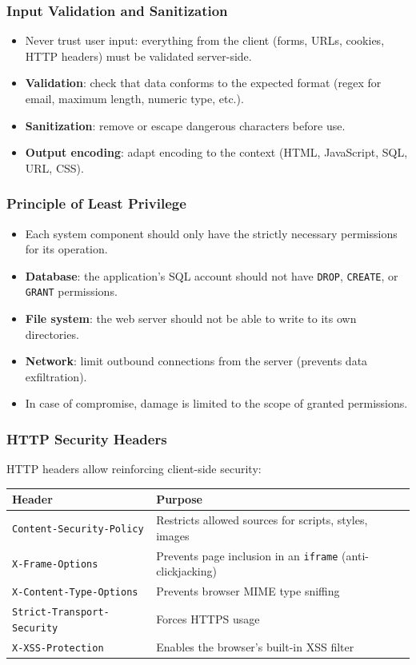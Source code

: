 \documentclass{beamer}
\begin{document}
\begin{frame}
\frametitle{Input Validation and Sanitization}

\begin{itemize}
\item \alert{Never trust user input}: everything from the client (forms, URLs, cookies, HTTP headers) must be validated server-side.
\item \textbf{Validation}: check that data conforms to the expected format (regex for email, maximum length, numeric type, etc.).
\item \textbf{Sanitization}: remove or escape dangerous characters before use.
\item \textbf{Output encoding}: adapt encoding to the context (HTML, JavaScript, SQL, URL, CSS).
\end{itemize}
\end{frame}


\begin{frame}
\frametitle{Principle of Least Privilege}

\begin{itemize}
\item Each system component should only have the \alert{strictly necessary permissions} for its operation.
\item \textbf{Database}: the application's SQL account should not have \texttt{DROP}, \texttt{CREATE}, or \texttt{GRANT} permissions.
\item \textbf{File system}: the web server should not be able to write to its own directories.
\item \textbf{Network}: limit outbound connections from the server (prevents data exfiltration).
\item In case of compromise, damage is \alert{limited} to the scope of granted permissions.
\end{itemize}
\end{frame}


\begin{frame}[fragile]
\frametitle{HTTP Security Headers}

HTTP headers allow reinforcing client-side security:

\begin{small}
\begin{tabular}{|l|p{6cm}|}
\hline
\textbf{Header} & \textbf{Purpose} \\
\hline
\texttt{Content-Security-Policy} & Restricts allowed sources for scripts, styles, images \\
\hline
\texttt{X-Frame-Options} & Prevents page inclusion in an \texttt{iframe} (anti-clickjacking) \\
\hline
\texttt{X-Content-Type-Options} & Prevents browser MIME type sniffing \\
\hline
\texttt{Strict-Transport-Security} & Forces HTTPS usage \\
\hline
\texttt{X-XSS-Protection} & Enables the browser's built-in XSS filter \\
\hline
\end{tabular}
\end{small}
\end{frame}
\end{document}
